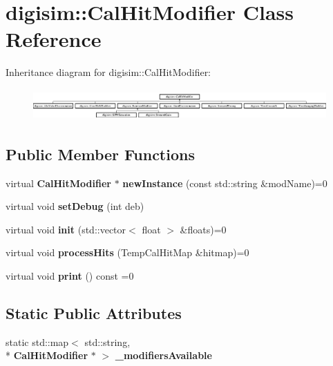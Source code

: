 \section{digisim\-:\-:Cal\-Hit\-Modifier Class Reference}
\label{classdigisim_1_1CalHitModifier}
Inheritance diagram for digisim\-:\-:Cal\-Hit\-Modifier\-:\begin{figure}[H]
\begin{center}
\leavevmode
\includegraphics[height=1.212121cm]{classdigisim_1_1CalHitModifier}
\end{center}
\end{figure}
\subsection*{Public Member Functions}
\begin{DoxyCompactItemize}
\item 
virtual {\bf Cal\-Hit\-Modifier} $\ast$ {\bfseries new\-Instance} (const std\-::string \&mod\-Name)=0\label{classdigisim_1_1CalHitModifier_a78f014f6849ab103ddbe94093db157ff}

\item 
virtual void {\bfseries set\-Debug} (int deb)\label{classdigisim_1_1CalHitModifier_a40b3f84abd58a31f5f7c755f3289b68d}

\item 
virtual void {\bfseries init} (std\-::vector$<$ float $>$ \&floats)=0\label{classdigisim_1_1CalHitModifier_aa42345de981ae1c1be57db93f3d0870b}

\item 
virtual void {\bfseries process\-Hits} (Temp\-Cal\-Hit\-Map \&hitmap)=0\label{classdigisim_1_1CalHitModifier_a26d09ac955c90b605d14be89da08b1f3}

\item 
virtual void {\bfseries print} () const =0\label{classdigisim_1_1CalHitModifier_ae0f77ccebc8851ea8f9867b6ba5c6aa6}

\end{DoxyCompactItemize}
\subsection*{Static Public Attributes}
\begin{DoxyCompactItemize}
\item 
static std\-::map$<$ std\-::string, \\*
{\bf Cal\-Hit\-Modifier} $\ast$ $>$ {\bfseries \-\_\-modifiers\-Available}\label{classdigisim_1_1CalHitModifier_a08096a0d105eb7415212805c6312b9db}

\end{DoxyCompactItemize}
